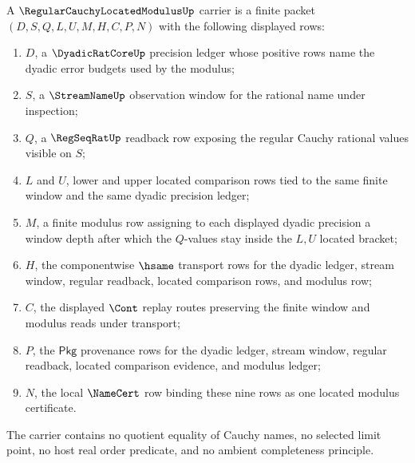 \begin{definition}
\label{def:regular-cauchy-located-modulus-carrier}
A $\RegularCauchyLocatedModulusUp$ carrier is a finite packet
$(D,S,Q,L,U,M,H,C,P,N)$ with the following displayed rows:
\begin{enumerate}
\item $D$, a $\DyadicRatCoreUp$ precision ledger whose positive rows name the
dyadic error budgets used by the modulus;
\item $S$, a $\StreamNameUp$ observation window for the rational name under
inspection;
\item $Q$, a $\RegSeqRatUp$ readback row exposing the regular Cauchy rational
values visible on $S$;
\item $L$ and $U$, lower and upper located comparison rows tied to the same
finite window and the same dyadic precision ledger;
\item $M$, a finite modulus row assigning to each displayed dyadic precision a
window depth after which the $Q$-values stay inside the $L,U$ located bracket;
\item $H$, the componentwise $\hsame$ transport rows for the dyadic ledger,
stream window, regular readback, located comparison rows, and modulus row;
\item $C$, the displayed $\Cont$ replay routes preserving the finite window and
modulus reads under transport;
\item $P$, the $\mathsf{Pkg}$ provenance rows for the dyadic ledger, stream
window, regular readback, located comparison evidence, and modulus ledger;
\item $N$, the local $\NameCert$ row binding these nine rows as one located
modulus certificate.
\end{enumerate}
The carrier contains no quotient equality of Cauchy names, no selected limit
point, no host real order predicate, and no ambient completeness principle.
\end{definition}

